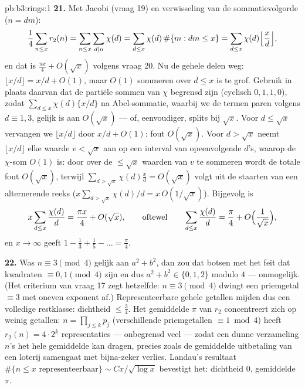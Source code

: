 \begin{solution}{pb:b3:rings:1}
\textbf{21.} Met Jacobi (vraag 19) en verwisseling van de
sommatievolgorde ($n = dm$):
\[
\frac14\sum_{n\leq x}r_2(n) = \sum_{n \leq x}\sum_{d \mid
n}\chi(d) = \sum_{d \leq x}\chi(d)\,\#\{m : dm \leq x\}
= \sum_{d\leq x}\chi(d)\Bigl\lfloor\frac xd\Bigr\rfloor,
\]
en dat is $\frac{\pi x}4 + O(\sqrt x)$ volgens vraag 20. Nu de
gehele delen weg: $\lfloor x/d\rfloor = x/d + O(1)$, maar $O(1)$
sommeren over $d \leq x$ is te grof. Gebruik in plaats daarvan dat
de partiële sommen van $\chi$ begrensd zijn (cyclisch $0, 1, 1,
0$), zodat $\sum_{d\leq x}\chi(d)\{x/d\}$ na Abel-sommatie, waarbij
we de termen paren volgens $d \equiv 1, 3$, gelijk is aan $O(\sqrt
x)$ --- of, eenvoudiger, splits bij $\sqrt x$. Voor $d \leq \sqrt
x$ vervangen we $\lfloor x/d\rfloor$ door $x/d + O(1)$: fout
$O(\sqrt x)$. Voor $d > \sqrt x$ neemt $\lfloor x/d\rfloor$ elke
waarde $v < \sqrt x$ aan op een interval van opeenvolgende $d$'s,
waarop de $\chi$-som $O(1)$ is: door over de $\leq \sqrt x$ waarden
van $v$ te sommeren wordt de totale fout $O(\sqrt x)$, terwijl
$\sum_{d > \sqrt x}\chi(d)\frac xd = O(\sqrt x)$ volgt uit de
staarten van een alternerende reeks ($x\sum_{d>\sqrt x}\chi(d)/d =
x\,O(1/\sqrt x)$). Bijgevolg is
\[
x\sum_{d \leq x}\frac{\chi(d)}d = \frac{\pi x}4 + O(\sqrt x),
\qquad\text{oftewel}\qquad
\sum_{d\leq x}\frac{\chi(d)}d = \frac\pi4 +
O\Bigl(\frac1{\sqrt x}\Bigr),
\]
en $x \to \infty$ geeft $1 - \frac13 + \frac15 - \dots =
\frac\pi4$.

\textbf{22.} Was $n \equiv 3 \pmod4$ gelijk aan $a^2 + b^2$, dan
zou dat botsen met het feit dat kwadraten $\equiv 0, 1 \pmod 4$
zijn en dus $a^2 + b^2 \in \{0, 1, 2\}$ modulo $4$ --- onmogelijk.
(Het criterium van vraag 17 zegt hetzelfde: $n \equiv 3 \pmod 4$
dwingt een priemgetal $\equiv 3$ met oneven exponent af.)
Representeerbare gehele getallen mijden dus een volledige
restklasse: dichtheid $\leq \frac34$. Het gemiddelde $\pi$ van
$r_2$ concentreert zich op weinig getallen: $n = \prod_{j\leq
k}p_j$ (verschillende priemgetallen $\equiv 1 \bmod 4$) heeft
$r_2(n) = 4\cdot2^k$ representaties --- onbegrensd veel --- zodat
een dunne verzameling $n$'s het hele gemiddelde kan dragen, precies
zoals de gemiddelde uitbetaling van een loterij samengaat met
bijna-zeker verlies. Landau's resultaat $\#\{n \leq x
\text{ representeerbaar}\} \sim Cx/\sqrt{\log x}$ bevestigt het:
dichtheid $0$, gemiddelde $\pi$.


\end{solution}
